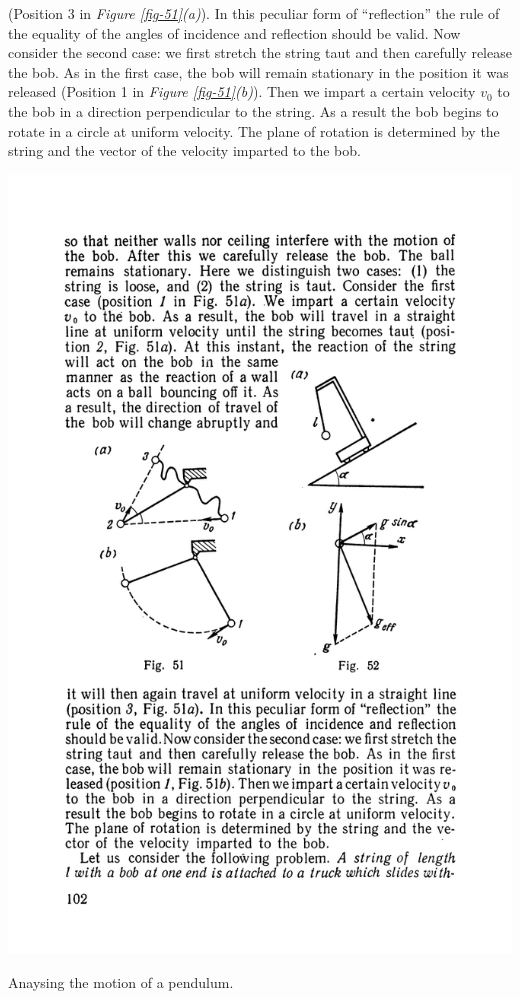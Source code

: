 \documentclass[a4paper,sfsidenotes]{tufte-book}
\begin{document}
(Position 3 in \emph{Figure \ref{fig-51}(a)}). In this peculiar form of ``reflection'' the rule of the equality of the angles of incidence and reflection should be valid. Now consider the second case: we first stretch the string taut and then carefully release the bob. As in the first case, the bob will remain stationary in the position it was released (Position 1 in \emph{Figure \ref{fig-51}(b)}). Then we impart a certain velocity  $v_{0}$ to the bob in a direction perpendicular to the string. As a result the bob begins to rotate in a circle at uniform velocity. The plane of rotation is determined by the string and the vector of the velocity imparted to the bob.
\\
\begin{marginfigure}
\centering
\includegraphics[width=\linewidth]{fig-052a.pdf}
\caption{Anaysing the motion of a pendulum.}
\label{fig-52}
\end{marginfigure}
\end{document}
